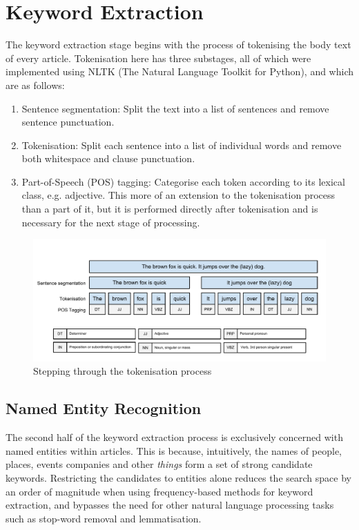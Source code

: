 \section{Keyword Extraction}

The keyword extraction stage begins with the process of tokenising the body text of every article. Tokenisation here has three substages, all of which were implemented using NLTK (The Natural Language Toolkit for Python), and which are as follows:
\begin{enumerate}
	\item Sentence segmentation: Split the text into a list of sentences and remove sentence punctuation.
	\item Tokenisation: Split each sentence into a list of individual words and remove both whitespace and clause punctuation.
	\item Part-of-Speech (POS) tagging: Categorise each token according to its lexical class, e.g. adjective. This more of an extension to the tokenisation process than a part of it, but it is performed directly after tokenisation and is necessary for the next stage of processing.
\end{enumerate}
\begin{figure}[htbp!]
	\centering
	\includegraphics[width=\textwidth]{img/implementation/Tokenisation.pdf}
	\caption{Stepping through the tokenisation process}
	\label{fig:tokenisation}
\end{figure}

\subsection{Named Entity Recognition}

The second half of the keyword extraction process is exclusively concerned with named entities within articles. This is because, intuitively, the names of people, places, events companies and other \textit{things} form a set of strong candidate keywords. Restricting the candidates to entities alone reduces the search space by an order of magnitude when using frequency-based methods for keyword extraction, and bypasses the need for other natural language processing tasks such as stop-word removal and lemmatisation.

